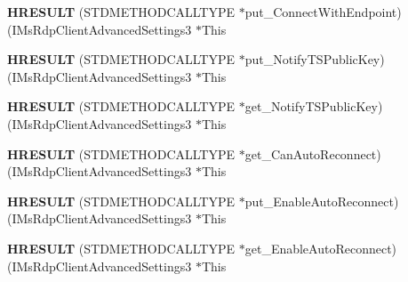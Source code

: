 \begin{DoxyCompactItemize}
\item 
\mbox{\label{struct_i_ms_rdp_client_advanced_settings3_vtbl_af0e1a800a228b900f878c006caeb8e63}} 
{\bfseries H\+R\+E\+S\+U\+LT} (S\+T\+D\+M\+E\+T\+H\+O\+D\+C\+A\+L\+L\+T\+Y\+PE $\ast$put\+\_\+\+Connect\+With\+Endpoint)(I\+Ms\+Rdp\+Client\+Advanced\+Settings3 $\ast$This
\item 
\mbox{\label{struct_i_ms_rdp_client_advanced_settings3_vtbl_ac20c73e5203f978437d23a582f2ff696}} 
{\bfseries H\+R\+E\+S\+U\+LT} (S\+T\+D\+M\+E\+T\+H\+O\+D\+C\+A\+L\+L\+T\+Y\+PE $\ast$put\+\_\+\+Notify\+T\+S\+Public\+Key)(I\+Ms\+Rdp\+Client\+Advanced\+Settings3 $\ast$This
\item 
\mbox{\label{struct_i_ms_rdp_client_advanced_settings3_vtbl_a1ddd91f24a183484fe7829c7759b03d7}} 
{\bfseries H\+R\+E\+S\+U\+LT} (S\+T\+D\+M\+E\+T\+H\+O\+D\+C\+A\+L\+L\+T\+Y\+PE $\ast$get\+\_\+\+Notify\+T\+S\+Public\+Key)(I\+Ms\+Rdp\+Client\+Advanced\+Settings3 $\ast$This
\item 
\mbox{\label{struct_i_ms_rdp_client_advanced_settings3_vtbl_a5b791778bf155a681ac4859bd3177809}} 
{\bfseries H\+R\+E\+S\+U\+LT} (S\+T\+D\+M\+E\+T\+H\+O\+D\+C\+A\+L\+L\+T\+Y\+PE $\ast$get\+\_\+\+Can\+Auto\+Reconnect)(I\+Ms\+Rdp\+Client\+Advanced\+Settings3 $\ast$This
\item 
\mbox{\label{struct_i_ms_rdp_client_advanced_settings3_vtbl_aa815853f71da71d87f63089b7d4b818b}} 
{\bfseries H\+R\+E\+S\+U\+LT} (S\+T\+D\+M\+E\+T\+H\+O\+D\+C\+A\+L\+L\+T\+Y\+PE $\ast$put\+\_\+\+Enable\+Auto\+Reconnect)(I\+Ms\+Rdp\+Client\+Advanced\+Settings3 $\ast$This
\item 
\mbox{\label{struct_i_ms_rdp_client_advanced_settings3_vtbl_adcd40760b42ffe508e74c2eafc1cea19}} 
{\bfseries H\+R\+E\+S\+U\+LT} (S\+T\+D\+M\+E\+T\+H\+O\+D\+C\+A\+L\+L\+T\+Y\+PE $\ast$get\+\_\+\+Enable\+Auto\+Reconnect)(I\+Ms\+Rdp\+Client\+Advanced\+Settings3 $\ast$This
\item 
\mbox{\label{struct_i_ms_rdp_client_advanced_settings3_vtbl_aa98e70aaaae11ca7bdbbaf715d667053}} 

\end{DoxyCompactItemize}
